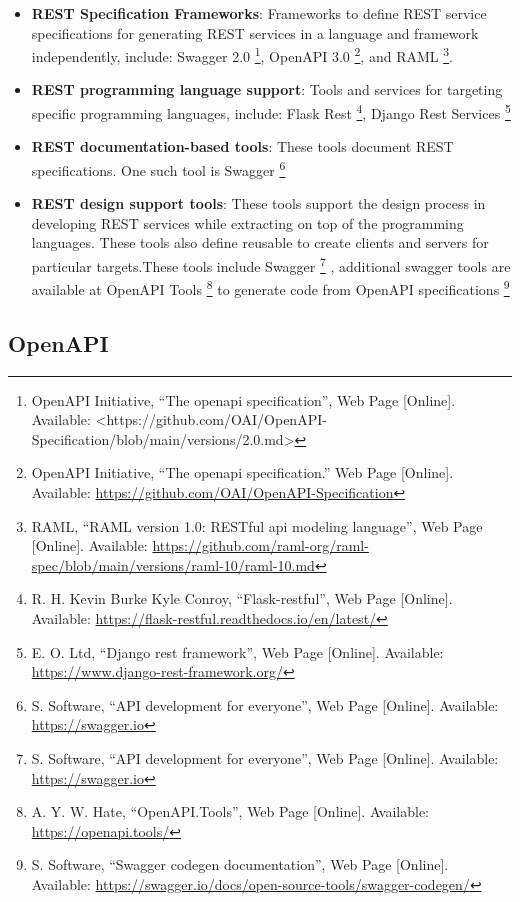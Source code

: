 \begin{itemize}
\tightlist
\item
  \textbf{REST Specification Frameworks}: Frameworks to define REST
  service specifications for generating REST services in a language and
  framework independently, include: Swagger 2.0 \footnote{OpenAPI
    Initiative, ``The openapi specification'', Web Page {[}Online{]}.
    Available: \textless https://github.com/OAI/OpenAPI-
    Specification/blob/main/versions/2.0.md\textgreater{}}, OpenAPI 3.0
  \footnote{OpenAPI Initiative, ``The openapi specification.'' Web Page
    {[}Online{]}. Available:
    \url{https://github.com/OAI/OpenAPI-Specification}}, and RAML
  \footnote{RAML, ``RAML version 1.0: RESTful api modeling language'',
    Web Page {[}Online{]}. Available:
    \url{https://github.com/raml-org/raml-spec/blob/main/versions/raml-10/raml-10.md}}.
\item
  \textbf{REST programming language support}: Tools and services for
  targeting specific programming languages, include: Flask Rest
  \footnote{R. H. Kevin Burke Kyle Conroy, ``Flask-restful'', Web Page
    {[}Online{]}. Available:
    \url{https://flask-restful.readthedocs.io/en/latest/}}, Django Rest
  Services \footnote{E. O. Ltd, ``Django rest framework'', Web Page
    {[}Online{]}. Available:
    \url{https://www.django-rest-framework.org/}}
\item
  \textbf{REST documentation-based tools}: These tools document REST
  specifications. One such tool is Swagger \footnote{S. Software, ``API
    development for everyone'', Web Page {[}Online{]}. Available:
    \url{https://swagger.io}}
\item
  \textbf{REST design support tools}: These tools support the design
  process in developing REST services while extracting on top of the
  programming languages. These tools also define reusable to create
  clients and servers for particular targets.These tools include Swagger
  \footnote{S. Software, ``API development for everyone'', Web Page
    {[}Online{]}. Available: \url{https://swagger.io}} , additional
  swagger tools are available at OpenAPI Tools \footnote{A. Y. W. Hate,
    ``OpenAPI.Tools'', Web Page {[}Online{]}. Available:
    \url{https://openapi.tools/}} to generate code from OpenAPI
  specifications \footnote{S. Software, ``Swagger codegen
    documentation'', Web Page {[}Online{]}. Available:
    \url{https://swagger.io/docs/open-source-tools/swagger-codegen/}}
\end{itemize}

\subsection{OpenAPI}

